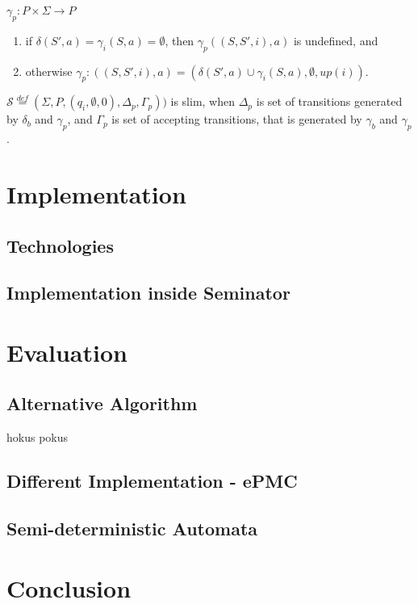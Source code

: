\documentclass[
	digital
nolof, nolot
]{fithesis3}
\newcommand{\cS}{\mathcal{S}}
\newcommand{\eqdef}{\overset{def}{=}}
\begin{document}
		
				$\gamma_{p}: P \times \Sigma \rightarrow P$
			\begin{enumerate}
				\item if $\delta(S',a)=\gamma_{i}(S, a)=\emptyset$, then $ \gamma_{p}((S,S',i),a)$ is undefined, and
				\item otherwise $\gamma_p \colon ((S,S',i),a) = (\delta(S',a)\cup \gamma_{i}(S, a), \emptyset, up(i))$.
			\end{enumerate}
			$\cS\eqdef(\Sigma, P, (q_i,\emptyset,0), \Delta_p,\Gamma_p))$ is slim, when $\Delta_p$ is set of transitions generated by $\delta_b$ and $\gamma_p$, and $\Gamma_p$ is set of accepting transitions, that is generated by $\gamma_b$ and $\gamma_p$.
			
	\chapter{Implementation}
		\section{Technologies}
		\section{Implementation inside Seminator}
	\chapter{Evaluation}
		\section{Alternative Algorithm}
			hokus pokus
		\section{Different Implementation - ePMC}
		\section{Semi-deterministic Automata}
	\chapter{Conclusion}
\end{document}
